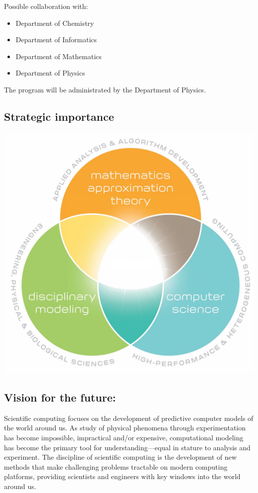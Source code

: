 \documentclass[%
oneside,                 %
final,                   %
10pt]{article}
\begin{document}
Possible collaboration with:

\begin{itemize}
 \item Department of Chemistry

 \item Department of Informatics

 \item Department of Mathematics

 \item Department of Physics
\end{itemize}

\noindent
The program will be administrated by the Department of Physics.



\subsection*{Strategic importance}

\vspace{6mm}

\centerline{\includegraphics[width=0.6\linewidth]{figslides/cs.jpg}}

\vspace{6mm}

\subsection*{Vision for the future:}

Scientific computing focuses on the development of predictive computer
models of the world around us. As study of physical phenomena through
experimentation has become impossible, impractical and/or expensive,
computational modeling has become the primary tool for
understanding—equal in stature to analysis and experiment. 
The discipline of scientific computing
is the development of new methods that make challenging problems
tractable on modern computing platforms, providing scientists and
engineers with key windows into the world around us.
\end{document}
